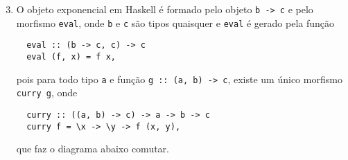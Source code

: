 \documentclass{beamer}
\begin{document}
  \begin{frame}[fragile]
    \begin{enumerate}
        \setcounter{enumi}{2}
  \item O objeto exponencial em Haskell \'e formado pelo objeto \texttt{b -> c} e pelo morfismo \texttt{eval}, onde \texttt{b} e \texttt{c} s\~ao tipos quaisquer 
    e \texttt{eval} \'e gerado pela fun\c{c}\~ao
\begin{verbatim}
  eval :: (b -> c, c) -> c
  eval (f, x) = f x,
\end{verbatim}
pois para todo tipo \texttt{a}
e fun\c{c}\~ao \texttt{g :: (a, b) -> c},
existe um \'unico morfismo \texttt{curry g},
onde 
\begin{verbatim}
  curry :: ((a, b) -> c) -> a -> b -> c
  curry f = \x -> \y -> f (x, y),
\end{verbatim}
que faz o diagrama abaixo comutar.
\begin{figure}[H]
    \centering
    \label{comuexp}
\end{figure}
\end{enumerate}
  \end{frame}
\end{document}
